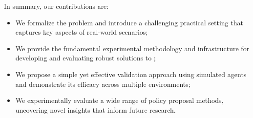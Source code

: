 In summary, our contributions are:
\begin{itemize}
\item We formalize the \ourMethod problem and introduce a challenging practical setting that captures key aspects of real-world scenarios; 
\item We provide the fundamental experimental methodology and infrastructure for developing and evaluating robust solutions to \ourMethod;
\item We propose a simple yet effective validation approach using simulated agents and demonstrate its efficacy across multiple environments;
\item We experimentally evaluate a wide range of policy proposal methods, uncovering novel insights that inform future research.
\end{itemize}



